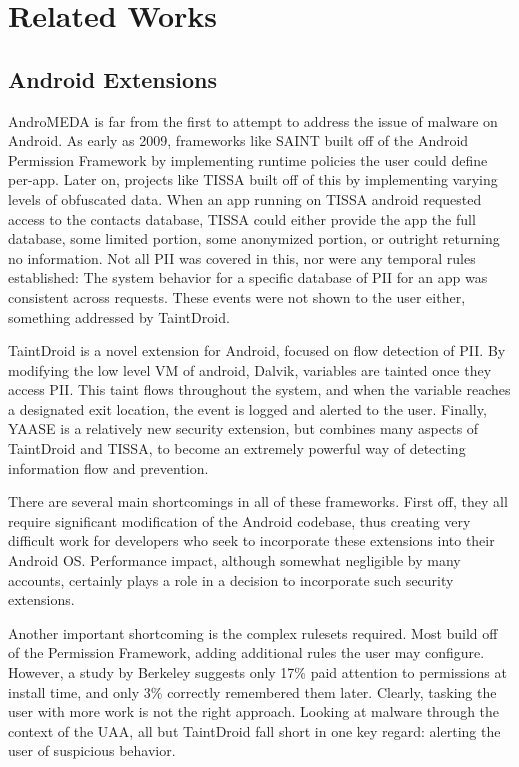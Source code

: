 \chapter{Related Works}
\label{sec:relatedworks}


\section{Android Extensions}
AndroMEDA is far from the first to attempt to address the issue of malware on Android. As early as 2009, frameworks like SAINT\citep{ongtang2012semantically} built off of the Android Permission Framework by implementing runtime policies the user could define per-app. Later on, projects like TISSA\citep{zhou2011taming} built off of this by implementing varying levels of obfuscated data. When an app running on TISSA android requested access to the contacts database, TISSA could either provide the app the full database, some limited portion, some anonymized portion, or outright returning no information. Not all PII was covered in this, nor were any temporal rules established: The system behavior for a specific database of PII for an app was consistent across requests. These events were not shown to the user either, something addressed by TaintDroid\citep{enck2010taintdroid}.

TaintDroid is a novel extension for Android, focused on flow detection of PII. By modifying the low level VM of android, Dalvik, variables are tainted once they access PII. This taint flows throughout the system, and when the variable reaches a designated exit location, the event is logged and alerted to the user. Finally, YAASE\citep{russello2011yaase} is a relatively new security extension, but combines many aspects of TaintDroid and TISSA, to become an extremely powerful way of detecting information flow and prevention.

There are several main shortcomings in all of these frameworks. First off, they all require significant modification of the Android codebase, thus creating very difficult work for developers who seek to incorporate these extensions into their Android OS. Performance impact, although somewhat negligible by many accounts, certainly plays a role in a decision to incorporate such security extensions.

Another important shortcoming is the complex rulesets required. Most build off of the Permission Framework, adding additional rules the user may configure. However, a study by Berkeley suggests only 17\% paid attention to permissions at install time, and only 3\% correctly remembered them later\citep{felt2012android}. Clearly, tasking the user with more work is not the right approach. Looking at malware through the context of the UAA, all but TaintDroid fall short in one key regard: alerting the user of suspicious behavior.

